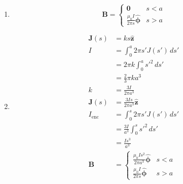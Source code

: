 \documentclass{article}
\renewcommand{\vec}[1]{\boldsymbol{\mathbf{#1}}}
\newcommand{\uvec}[1]{\hat{\vec{#1}}}
\begin{document}
\setcounter{subsection}{13}
\subsection{}

\begin{enumerate}
  \item

        \[\vec{B} = \begin{cases}
            \vec{0}                             & s < a \\
            \frac{\mu_0 I}{2 \pi s} \uvec{\phi} & s > a
          \end{cases}\]

  \item

        \begin{align*}
          \vec{J}(s)   & = k s \uvec{z}                                      \\
          I            & = \int_0^a 2 \pi s' J(s') \,d s'                    \\
                       & = 2 \pi k \int_0^a s'^2 \,d s'                      \\
                       & = \frac{2}{3} \pi k a^3                             \\
          k            & = \frac{3 I}{2 \pi a^3}                             \\
          \vec{J}(s)   & = \frac{3 I s}{2 \pi a^3} \uvec{z}                  \\
          I_\text{enc} & = \int_0^s 2 \pi s' J(s') \,d s'                    \\
                       & = \frac{3 I}{a^3} \int_0^s s'^2 \,d s'              \\
                       & = \frac{I s^3}{a^3}                                 \\
          \vec{B}      & = \begin{cases}
                             \frac{\mu_0 I s^2}{2 \pi a^3} \uvec{\phi} & s < a \\
                             \frac{\mu_0 I}{2 \pi s} \uvec{\phi}       & s > a
                           \end{cases}
        \end{align*}
\end{enumerate}

\subsection{}
\end{document}
